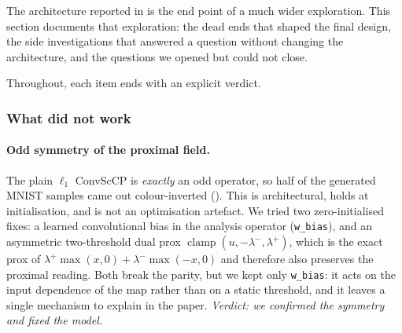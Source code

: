 \documentclass[a4paper,11pt]{article}
\theoremstyle{plain}{\theorembodyfont{\rmfamily}%
\newtheorem{proposition}[theorem]{Proposition}}
\theoremstyle{plain}{\theorembodyfont{\rmfamily}%
\newtheorem{notation}[theorem]{Notation}}
\theoremstyle{plain}{\theorembodyfont{\rmfamily}%
\newtheorem{assumption}[theorem]{Assumption}}
\theoremstyle{plain}{\theorembodyfont{\rmfamily}%
\newtheorem{problem}[theorem]{Problem}}
\theoremstyle{plain}{\theorembodyfont{\rmfamily}%
\newtheorem{example}[theorem]{Example}}
\theoremstyle{plain}{\theorembodyfont{\rmfamily}%
\newtheorem{remark}[theorem]{Remark}}
\theoremstyle{plain}{\theorembodyfont{\rmfamily}%
\newtheorem{definition}[theorem]{Definition}}
\theoremstyle{plain}{\theorembodyfont{\rmfamily}%
\newtheorem{question}[theorem]{Question}}
\numberwithin{equation}{section}
\begin{document}
The architecture reported in  is the end point of a much
wider exploration. This section documents that exploration: the dead ends that
shaped the final design, the side investigations that answered a question without
changing the architecture, and the questions we opened but could not close.

Throughout, each item ends with an explicit verdict.

\subsubsection{What did not work}
\label{subsec:whatdidnotwork}

\paragraph{Odd symmetry of the proximal field.} The plain $\ell_1$ ConvScCP is
\emph{exactly} an odd operator, so half of the generated MNIST samples came out
colour-inverted (). This is architectural, holds at
initialisation, and is not an optimisation artefact. We tried two zero-initialised
fixes: a learned convolutional bias in the analysis operator (\texttt{w\_bias}),
and an asymmetric two-threshold dual prox
$\operatorname{clamp}(u,-\lambda^-,\lambda^+)$, which is the exact prox of
$\lambda^+\max(x,0)+\lambda^-\max(-x,0)$ and therefore also preserves the proximal
reading. Both break the parity, but we kept only \texttt{w\_bias}: it acts on the
input dependence of the map rather than on a static threshold, and it leaves a
single mechanism to explain in the paper. \emph{Verdict: we confirmed the symmetry and fixed the model.}
\end{document}
